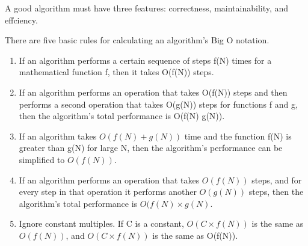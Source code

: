 \begin{mdframed}[style=theorem, frametitle={Algorithm Features}]
	A good algorithm must have three features: correctness, maintainability, and
effciency.
\end{mdframed}

There are five basic rules for calculating an algorithm’s Big O notation.

\begin{enumerate}
\item If an algorithm performs a certain sequence of steps f(N) times for a mathematical function f, then it takes O(f(N)) steps.
\item  If an algorithm performs an operation that takes O(f(N)) steps and then
performs a second operation that takes O(g(N)) steps for functions f and
g, then the algorithm’s total performance is O(f(N) g(N)).
\item  If an algorithm takes $O(f(N)+g(N))$ time and the function f(N) is greater
than g(N) for large N, then the algorithm’s performance can be simplified
to $O(f(N))$.
\item  If an algorithm performs an operation that takes $O(f(N))$ steps, and for
every step in that operation it performs another $O(g(N))$ steps, then the
algorithm’s total performance is $O(f(N)\times g(N)$.
\item  Ignore constant multiples. If C is a constant, $O(C \times f(N))$ is the same as
$O(f(N))$, and $O(C \times f(N))$ is the same as O(f(N)).

\end{enumerate}